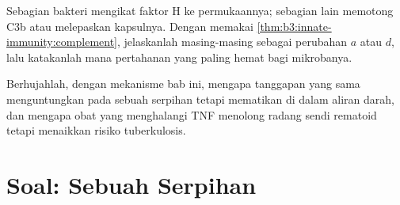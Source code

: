 \begin{exercise}[$\star\star\star$]\label{exo:b3:innate-immunity:11}
Sebagian bakteri mengikat faktor H ke permukaannya; sebagian lain memotong C3b
atau melepaskan kapsulnya. Dengan memakai \cref{thm:b3:innate-immunity:complement},
jelaskanlah masing-masing sebagai perubahan $a$ atau $d$, lalu katakanlah mana
pertahanan yang paling hemat bagi mikrobanya.
\end{exercise}

\begin{exercise}[$\star\star\star$]\label{exo:b3:innate-immunity:12}
Berhujahlah, dengan mekanisme bab ini, mengapa tanggapan yang sama
menguntungkan pada sebuah serpihan tetapi mematikan di dalam aliran darah, dan
mengapa obat yang menghalangi TNF menolong radang sendi rematoid tetapi
menaikkan risiko tuberkulosis.
\end{exercise}

\section{Soal: Sebuah Serpihan}

